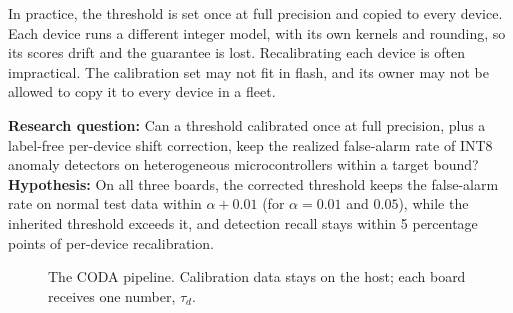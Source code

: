 \documentclass[conference]{IEEEtran}
\begin{document}
In practice, the threshold is set once at full precision and copied to every device. Each device runs a different integer model, with its own kernels and rounding, so its scores drift and the guarantee is lost. Recalibrating each device is often impractical. The calibration set may not fit in flash, and its owner may not be allowed to copy it to every device in a fleet.

\textbf{Research question:} Can a threshold calibrated once at full precision, plus a label-free per-device shift correction, keep the realized false-alarm rate of INT8 anomaly detectors on heterogeneous microcontrollers within a target bound?\\
\textbf{Hypothesis:} On all three boards, the corrected threshold keeps the false-alarm rate on normal test data within $\alpha+0.01$ (for $\alpha=0.01$ and $0.05$), while the inherited threshold exceeds it, and detection recall stays within 5 percentage points of per-device recalibration.

\begin{figure}[t]
\centering
{}
\caption{The CODA pipeline. Calibration data stays on the host; each board receives one number, $\tau_d$.}
\label{fig:pipeline}
\end{figure}
\end{document}
